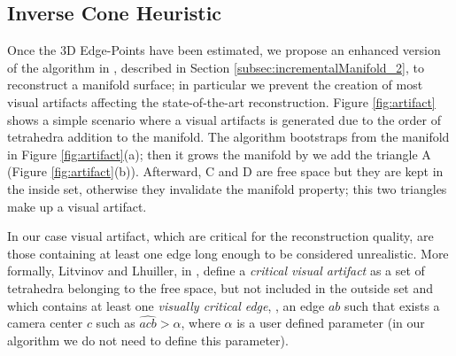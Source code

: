 \subsection{Inverse Cone Heuristic}
\label{sec:visualartifacts}
Once the 3D Edge-Points have been estimated, we propose an enhanced version of the algorithm in \cite{litvinov_lhuillier_13}, described in Section \ref{subsec:incrementalManifold_2}, to reconstruct a manifold surface; in particular we prevent the creation of most visual artifacts affecting the state-of-the-art reconstruction.
Figure \ref{fig:artifact} shows a simple scenario where a visual artifacts is generated due to the order of tetrahedra addition to the manifold.
The algorithm bootstraps from the manifold in Figure \ref{fig:artifact}(a); then it grows the manifold by we add the triangle A (Figure \ref{fig:artifact}(b)). Afterward, C and D are free space but they are kept in the inside set, otherwise they invalidate the manifold property; this two triangles make up a visual artifact.

In our case visual artifact, which are critical for the reconstruction quality, are those containing at least one edge long enough to be considered unrealistic. 
More formally, Litvinov and Lhuiller, in \cite{litvinov_Lhiuller14}, define a \emph{critical visual artifact} as a set of tetrahedra belonging to the free space, but not included in the outside set and which contains at least one \emph{visually critical edge}, \ie, an edge $ab$ such that exists a camera center $c$ such as $\widehat{acb}>\alpha$, where $\alpha$ is a user defined parameter (in our algorithm we do not need to define this parameter).

